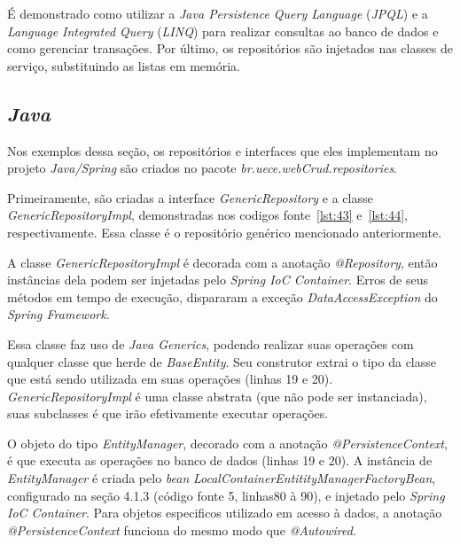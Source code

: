 É demonstrado como utilizar a \textit{Java Persistence Query Language} (\textit{JPQL}) e a \textit{Language Integrated Query} (\textit{LINQ}) para realizar consultas ao banco de dados e como gerenciar transações. Por último, os repositórios são injetados nas classes de serviço, substituindo as listas em memória.

\subsection{\textit{Java}}

Nos exemplos dessa seção, os repositórios e interfaces que eles implementam no projeto \textit{Java/Spring} são criados no pacote \textit{br.uece.webCrud.repositories}.

Primeiramente, são criadas a interface \textit{GenericRepository} e a classe \textit{GenericRepositoryImpl}, demonstradas nos codigos fonte~\ref{lst:43} e~\ref{lst:44}, respectivamente. Essa classe é o repositório genérico mencionado anteriormente.



A classe \textit{GenericRepositoryImpl} é decorada com a anotação \textit{@Repository}, então instâncias dela podem ser injetadas pelo \textit{Spring IoC Container}. Erros de seus métodos em tempo de execução, dispararam a exceção \textit{DataAccessException} do \textit{Spring Framework}.

Essa classe faz uso de \textit{Java Generics}, podendo realizar suas operações com qualquer classe que herde de \textit{BaseEntity}. Seu construtor extrai o tipo da classe que está sendo utilizada em suas operações (linhas 19 e 20). \textit{GenericRepositoryImpl} é uma classe abstrata (que não pode ser instanciada), suas subclasses é que irão efetivamente executar operações.

O objeto do tipo \textit{EntityManager}, decorado com a anotação \textit{@PersistenceContext}, é que executa as operações no banco de dados (linhas 19 e 20). A instância de \textit{EntityManager} é criada pelo \textit{bean} \textit{LocalContainerEntitityManagerFactoryBean}, configurado na seção 4.1.3 (código fonte 5, linhas80 à 90), e injetado pelo \textit{Spring IoC Container}. Para objetos especificos utilizado em acesso à dados, a anotação \textit{@PersistenceContext} funciona do mesmo modo que \textit{@Autowired}.

